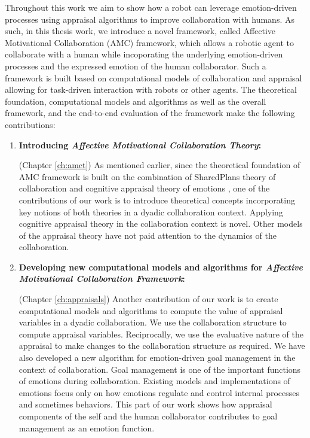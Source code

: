 \documentclass[12pt]{report}
\begin{document}
Throughout this work we aim to show how a robot can leverage emotion-driven
processes using appraisal algorithms to improve collaboration with humans. As
such, in this thesis work, we introduce a novel framework, called Affective
Motivational Collaboration (AMC) framework, which allows a robotic agent to
collaborate with a human while incoporating the underlying emotion-driven
processes and the expressed emotion of the human collaborator. Such a framework
is built based on computational models of collaboration and appraisal allowing
for task-driven interaction with robots or other agents. The theoretical
foundation, computational models and algorithms as well as the overall
framework, and the end-to-end evaluation of the framework make the following
contributions:

\begin{enumerate}
  \item \textbf{Introducing \textit{Affective Motivational Collaboration Theory}:}
    
  	(Chapter \ref{ch:amct}) As mentioned earlier, since the theoretical
  	foundation of AMC framework is built on the combination of SharedPlans
  	theory of collaboration \cite{grosz:plans-discourse} and cognitive appraisal
  	theory of emotions \cite{marsella:ema-process-model}
  	\cite{scherer:appraisal-processes}, one of the contributions of our work is
  	to introduce theoretical concepts incorporating key notions of both theories
  	in a dyadic collaboration context. Applying cognitive appraisal theory in the
  	collaboration context is novel. Other models of the appraisal theory have not
  	paid attention to the dynamics of the collaboration.
	
  \item \textbf{Developing new computational models and algorithms for
  \textit{Affective Motivational Collaboration Framework}:}
  
	(Chapter \ref{ch:appraisals}) Another contribution of our work is to create
	computational models and algorithms to compute the value of appraisal variables
	in a dyadic collaboration. We use the collaboration structure to compute
	appraisal variables. Reciprocally, we use the evaluative nature of the
	appraisal to make changes to the collaboration structure as required. We have
	also developed a new algorithm for emotion-driven goal management in the
	context of collaboration. Goal management is one of the important functions of
	emotions during collaboration. Existing models and implementations of emotions
	focus only on how emotions regulate and control internal processes and
	sometimes behaviors. This part of our work shows how appraisal components of
	the self and the human collaborator contributes to goal management as an
	emotion function.
  

\end{enumerate}
\end{document}
